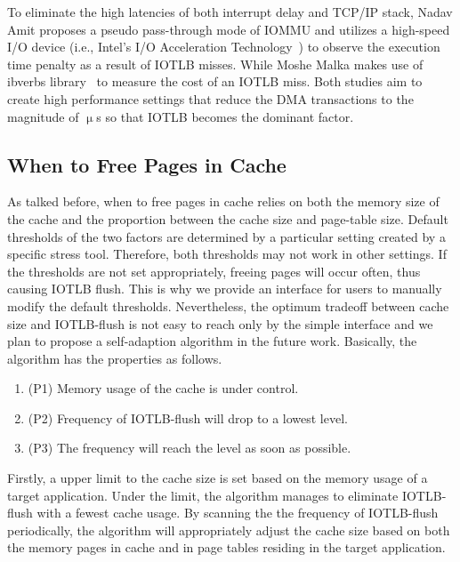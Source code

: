 To eliminate the high latencies of both interrupt delay and TCP/IP stack, Nadav Amit proposes a pseudo pass-through mode of IOMMU and utilizes a high-speed I/O device (i.e., Intel’s I/O Acceleration Technology~\cite{lauritzenintel}) to observe the execution time penalty as a result of IOTLB misses. While Moshe Malka makes use of ibverbs library~\cite{ibverbsevaluation,kerr2011dissecting} to measure the cost of an IOTLB miss.
Both studies aim to create high performance settings that reduce the DMA transactions to the magnitude of $\upmu$s so that IOTLB becomes the dominant factor.

\subsection{When to Free Pages in Cache}

As talked before, when to free pages in cache relies on both the memory size of the cache and the proportion between the cache size and page-table size. Default thresholds of the two factors are determined by a particular setting created by a specific stress tool. Therefore, both thresholds may not work in other settings. If the thresholds are not set appropriately, freeing pages will occur often, thus causing IOTLB flush. This is why we provide an interface for users to manually modify the default thresholds. Nevertheless, the optimum tradeoff between cache size and IOTLB-flush is not easy to reach only by the simple interface and we plan to propose a self-adaption algorithm in the future work. Basically, the algorithm has the properties as follows.
\begin{enumerate}
\item (P1) Memory usage of the cache is under control.
\item (P2) Frequency of IOTLB-flush will drop to a lowest level.
\item (P3) The frequency will reach the level as soon as possible.
\end{enumerate}

Firstly, a upper limit to the cache size is set based on the memory usage of a target application. Under the limit, the algorithm manages to eliminate IOTLB-flush with a fewest cache usage. By scanning the the frequency of IOTLB-flush periodically, the algorithm will appropriately adjust the cache size based on both the memory pages in cache and in page tables residing in the target application.




